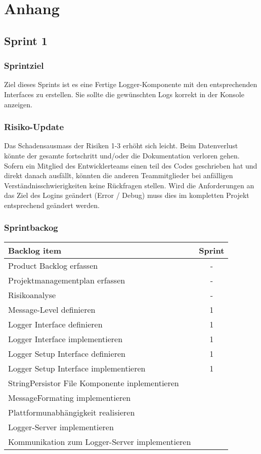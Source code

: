 \section{Anhang}
\subsection{Sprint 1}
\subsubsection{Sprintziel}
Ziel dieses Sprints ist es eine Fertige Logger-Komponente mit den entsprechenden Interfaces zu erstellen. Sie sollte die gewünschten Logs korrekt in der Konsole anzeigen. 
\subsubsection{Risiko-Update}
Das Schadensausmass der Risiken 1-3 erhöht sich leicht. 
Beim Datenverlust könnte der gesamte fortschritt und/oder die Dokumentation verloren gehen. 
Sofern ein Mitglied des Entwicklerteams einen teil des Codes geschrieben hat und direkt danach ausfällt, könnten die anderen Teammitglieder bei anfälligen Verständnisschwierigkeiten keine Rückfragen stellen.
Wird die Anforderungen an das Ziel des Logins geändert (Error / Debug) muss dies im kompletten Projekt entsprechend geändert werden. 
\subsubsection{Sprintbackog}
	\begin{tabularx}{\textwidth}{|p{}|c|}
		\hline
		\textbf{Backlog item} & \textbf{Sprint} \\
		\hline
		Product Backlog erfassen & -
\\
		\hline
		Projektmanagementplan erfassen & -
\\
		\hline
		Risikoanalyse & -
\\
		\hline
		Message-Level definieren & 1
\\
		\hline
		Logger Interface definieren & 1 \\
		\hline
		Logger Interface implementieren & 1
\\
		\hline
		Logger Setup Interface definieren & 1
\\
		\hline
		Logger Setup Interface implementieren & 1
\\
		\hline
		StringPersistor File Komponente inplementieren & \\
		\hline
		MessageFormating implementieren & \\
		\hline
		Plattformunabhängigkeit realisieren & \\
		\hline
		Logger-Server implementieren & \\
		\hline
		Kommunikation zum Logger-Server implementieren & \\
		\hline
	\end{tabularx}
